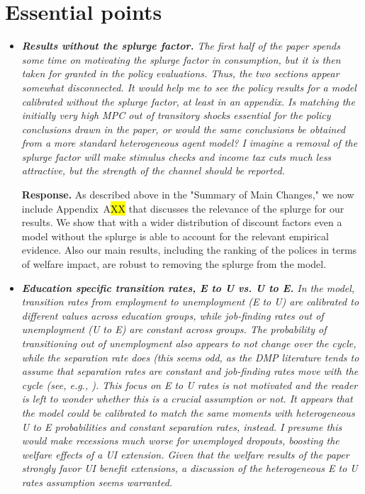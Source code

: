 \documentclass[12pt,letterpaper,english]{article}
\begin{document}
\section{Essential points}
\begin{itemize}
	
	\item \textit{\textbf{Results without the splurge factor.} The first half of the paper spends some time on motivating the splurge factor in consumption, but it is then taken for granted in the policy evaluations. Thus, the two sections appear somewhat disconnected. It would help me to see the policy results for a model calibrated	without the splurge factor, at least in an appendix. Is matching the initially very high MPC out of transitory shocks essential for the policy conclusions drawn in the paper, or would the same conclusions be obtained from a more standard heterogeneous agent model? I imagine a removal of the splurge factor will make stimulus checks and income tax cuts much less attractive, but the strength of the channel should be reported.}
	
	\noindent \textbf{Response.} As described above in the "Summary of Main Changes," we now include Appendix~A\hl{XX} that discusses the relevance of the splurge for our results. We show that with a wider distribution of discount factors even a model without the splurge is able to account for the relevant empirical evidence. Also our main results, including the ranking of the polices in terms of welfare impact, are robust to removing the splurge from the model. 

	\item \textit{\textbf{Education specific transition rates, E to U vs. U to E.} In the model, transition rates from employment to unemployment (E to U) are calibrated to different values across education groups, while job-finding rates out of unemployment (U to E) are constant across groups. The probability of transitioning out of unemployment also appears to not change over the cycle, while the separation rate does (this seems odd, as	the DMP literature tends to assume that separation rates are constant and job-finding rates move with the cycle (see, e.g., \citet{hagedorn2008cyclical}). This focus on E to U	rates is not motivated and the reader is left to wonder whether this is a crucial assumption or not. It appears that the model could be calibrated to match the same moments with heterogeneous U to E probabilities and constant separation rates, instead. I presume this would make recessions much worse for unemployed dropouts, boosting the welfare effects of a UI extension. Given that the welfare results of the paper strongly favor UI benefit extensions, a discussion of the heterogeneous E to U rates assumption seems warranted.}	
	

\end{itemize}
\end{document}
